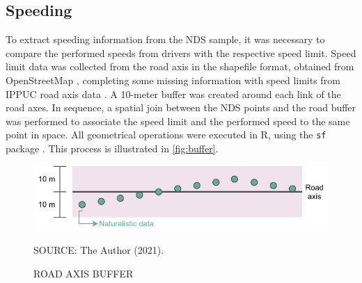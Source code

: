 
\subsection{Speeding} \label{sub:spd}





To extract speeding information from the NDS sample, it was necessary to compare the performed speeds from drivers with the respective speed limit. Speed limit data was collected from the road axis in the shapefile format, obtained from OpenStreetMap \cite{OpenStreetMap}, completing some missing information with speed limits from IPPUC road axis data \cite{IPPUC2021}. A 10-meter buffer was created around each link of the road axes. In sequence, a spatial join between the NDS points and the road buffer was performed to associate the speed limit and the performed speed to the same point in space. All geometrical operations were executed in R, using the \verb|sf| package \cite{pebesma2018}. This process is illustrated in \autoref{fig:buffer}. 

\begin{figure}[!htbp]
    \centering\footnotesize
    \captionsetup{font=footnotesize}
    \caption{ROAD AXIS BUFFER}
    \includegraphics{fig/buffer.pdf}
    \label{fig:buffer}
    \par SOURCE: The Author (2021).
\end{figure}

